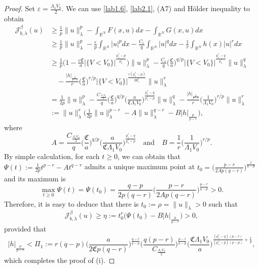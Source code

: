 \documentclass[10pt,a4paper]{amsart}
\numberwithin{equation}{section}
\begin{document}
\begin{proof}
Set $\varepsilon=\frac{\Lambda_1 V_0}{2}$. We can use \eqref{lab1.6}, \eqref{lab2.1}, 
(A7) and H\"older inequality to obtain
\begin{align*}
 \mathcal{J}^\beta_{b,\lambda}(u) 
&\geq \frac{1}{p} \|u\|^p_\lambda-\int_{\mathbb{R}^N}F(x,u)dx
 -\int_{\mathbb{R}^N}G(x,u)dx \\
&\geq \frac{1}{p} \|u\|^p_\lambda-\frac{\varepsilon}{p}\int_{\mathbb{R}^N}|u|^pdx
 -\frac{C_\varepsilon}{q} \int_{\mathbb{R}^N}|u|^qdx
 -\frac{1}{r}\int_{\mathbb{R}^N}h(x)|u|^rdx   \\
&\geq  \frac{1}{p}\Big(1-\frac{\varepsilon\mathfrak{C}}{a} |
 \{V<V_0\}|^{\frac{p^*_s-p}{p^*_s}}\Big)\|u\|^p_\lambda
 -\frac{C_\varepsilon}{q}\Big(\frac{\mathfrak{C}}{a}
 \Big)^{q/p}|\{V<V_0\}|^{\frac{p^*_s-q}{p^*_s}}\|u\|^q_\lambda   \\
&\quad -\frac{|h|_{\frac{p}{p-r}}}{r}\Big(\frac{\mathfrak{C}}{a}
 \Big)^{r/p}|\{V<V_0\}|^{\frac{r(p^*_s-p)}{pp^*_s}}\|u\|^r_\lambda  \\
&= \frac{1}{2p}\|u\|^p_\lambda-\frac{C_{\frac{\Lambda_1 V_0}{2}}}{q}
 \Big(\frac{\mathfrak{C}}{a}\Big)^{q/p}
 \Big(\frac{a}{\mathfrak{C}\Lambda_1V_0}\Big)^{\frac{p^*_s-q}{p^*_s-p}}
 \|u\|^q_\lambda -\frac{|h|_{\frac{p}{p-r}}}{r}
 \Big(\frac{1}{\Lambda_1V_0}\Big)^{r/p}\|u\|^r_\lambda    \\
&:= \|u\|^r_\lambda\Big(\frac{1}{2p}\|u\|^{p-r}_\lambda
 -A\|u\|^{q-r}_\lambda-B|h|_{\frac{p}{p-r}}\Big),
\end{align*}
where
$$
A=\frac{C_{\frac{\Lambda_1 V_0}{2}}}{q}\Big(\frac{\mathfrak{C}}{a}\Big)^{q/p}
\Big(\frac{a}{\mathfrak{C}\Lambda_1V_0}\Big)^{\frac{p^*_s-q}{p^*_s-p}}\quad
\text{and}\quad B=\frac{1}{r}\Big(\frac{1}{\Lambda_1V_0}\Big)^{r/p}.
$$
By simple calculation, for each $t\geq0$, we can obtain that
$\Psi(t):=\frac{1}{2p}t^{p-r}-At^{q-r}$
admits a unique maximum point at
$t_0=\Big(\frac{p-r}{2Ap(q-r)}\Big)^{\frac{1}{q-p}}$
and its maximum is
$$
\max_{t\geq0}\Psi(t)=\Psi(t_0)=\frac{q-p}{2p(q-r)}\Big(\frac{p-r}{2Ap(q-r)}
\Big)^{\frac{p-r}{q-p}}>0.
$$
Therefore, it is easy to deduce that there is $t_0:=\rho=\|u\|_\lambda>0$ such that
$$
\mathcal{J}^\beta_{b,\lambda}(u)\geq\eta:=t_0^r\Big(\Psi(t_0)-B|h|_{\frac{p}{p-r}}\Big)>0,
$$
provided that
$$
|h|_{\frac{p}{p-r}}
<\Pi_1:=r(q-p)\Big(\frac{a}{2\mathfrak{C}p(q-r)}\Big)^{\frac{q-r}{q-p}}
\Big(\frac{q(p-r)}{C_{\frac{\Lambda_1 V_0}{2}}}\Big)^{\frac{p-r}{q-p}}
\Big(\frac{\mathfrak{C}\Lambda_1V_0}{a}\Big)^{\frac{(p^*_s-q)(p-r)}{(p^*_s-p)
(q-p)}+\frac{r}{p}},
$$
which completes the proof of (i).


\end{proof}
\end{document}

